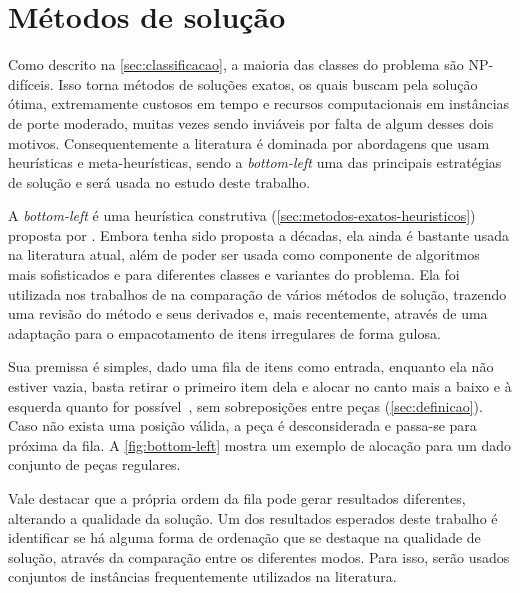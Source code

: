 \chapter{Métodos de solução}\label{ch:bottom-left}

Como descrito na \autoref{sec:classificacao}, a maioria das classes do problema são NP-difíceis.
Isso torna métodos de soluções exatos, os quais buscam pela solução ótima, extremamente custosos
em tempo e recursos computacionais em instâncias de porte moderado, muitas vezes sendo inviáveis
por falta de algum desses dois motivos.
Consequentemente a literatura é dominada por abordagens que usam heurísticas e meta-heurísticas,
sendo a \textit{bottom-left} uma das principais estratégias de solução e será usada no estudo
deste trabalho.

A \textit{bottom-left} é uma heurística construtiva (\cref{sec:metodos-exatos-heuristicos}) proposta
por .
Embora tenha sido proposta a décadas, ela ainda é bastante usada na literatura atual, além de poder
ser usada como componente de algoritmos mais sofisticados e para diferentes classes e variantes
do problema.
Ela foi utilizada nos trabalhos de  na comparação de vários
métodos de solução,  trazendo uma revisão do método e seus derivados
e, mais recentemente,  através de uma adaptação para o
empacotamento de itens irregulares de forma gulosa.

Sua premissa é simples, dado uma fila de itens como entrada, enquanto ela não estiver vazia,
basta retirar o primeiro item dela e alocar no canto mais a baixo e à esquerda quanto for
possível~\cite{aprendizado-reforco}, sem sobreposições entre peças (\autoref{sec:definicao}).
Caso não exista uma posição válida, a peça é desconsiderada e passa-se para próxima da fila.
A \autoref{fig:bottom-left} mostra um exemplo de alocação para um dado conjunto de peças regulares.



Vale destacar que a própria ordem da fila pode gerar resultados diferentes, alterando a qualidade
da solução.
Um dos resultados esperados deste trabalho é identificar se há alguma forma de ordenação que
se destaque na qualidade de solução, através da comparação entre os diferentes modos.
Para isso, serão usados conjuntos de instâncias frequentemente utilizados na literatura.



